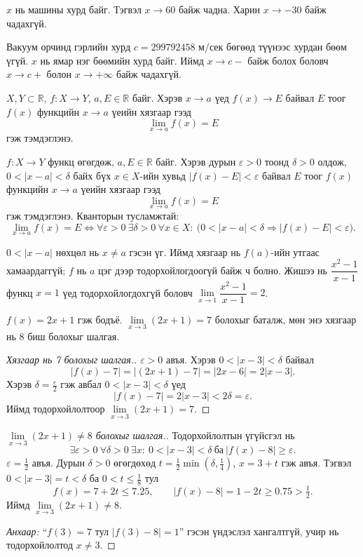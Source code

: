 \begin{example}
$x$ нь машины хурд байг. Тэгвэл $x \to 60$ байж чадна. Харин $x \to -30$ байж чадахгүй.

Вакуум орчинд гэрлийн хурд $c=299792458$ м/сек бөгөөд түүнээс хурдан бөөм үгүй. $x$ нь ямар нэг бөөмийн хурд байг.
Иймд $x \to c-$ байж болох боловч $x \to c+$ болон $x \to +\infty$ байж чадахгүй.
\end{example}
\begin{definition}
$X,Y \subset \mathbb{R}$, $f:X \to Y$, $a,E \in \mathbb{R}$ байг.
Хэрэв $x \to a$ үед $f(x) \to E$ байвал $E$ тоог $f(x)$ функцийн $x\to a$ үеийн хязгаар гээд
\[
\lim_{x \to a} f(x) = E
\]
гэж тэмдэглэнэ.
\end{definition}

\begin{definition}
$f:X \to Y$ функц өгөгдөж, $a,E \in \mathbb{R}$ байг.
Хэрэв дурын $\varepsilon>0$ тоонд $\delta>0$ олдож, $0<|x-a|<\delta$ байх бүх $x\in X$-ийн хувьд $|f(x)-E|<\varepsilon$ байвал $E$ тоог $f(x)$ функцийн $x\to a$ үеийн хязгаар гээд
\[
\lim_{x \to a} f(x) = E
\]
гэж тэмдэглэнэ. Кванторын тусламжтай:
\[
\lim_{x \to a} f(x) = E \iff \forall\varepsilon>0\ \exists\delta>0\ \forall x\in X:\ \bigl(0<|x-a|<\delta\Rightarrow|f(x)-E|<\varepsilon\bigr).
\]
\end{definition}

\begin{remark}
$0<|x-a|$ нөхцөл нь $x\neq a$ гэсэн үг. Иймд хязгаар нь $f(a)$-ийн утгаас хамаардаггүй;
$f$ нь $a$ цэг дээр тодорхойлогдоогүй байж ч болно. Жишээ нь $\dfrac{x^2-1}{x-1}$ функц $x=1$ үед
тодорхойлогдохгүй боловч $\lim\limits_{x\to1}\dfrac{x^2-1}{x-1}=2$.
\end{remark}

\begin{example}
$f(x)=2x+1$ гэж бодъё. $\lim\limits_{x\to 3}(2x+1)=7$ болохыг баталж, мөн энэ хязгаар нь 8 биш болохыг шалгая.

\begin{proof}[Хязгаар нь 7 болохыг шалгая.]
$\varepsilon>0$ авъя. Хэрэв $0<|x-3|<\delta$ байвал
\[
|f(x)-7| = |(2x+1)-7| = |2x-6| = 2|x-3|.
\]
Хэрэв $\delta=\tfrac{\varepsilon}{2}$ гэж авбал $0<|x-3|<\delta$ үед
\[
|f(x)-7| = 2|x-3| < 2\delta = \varepsilon.
\]
Иймд тодорхойлолтоор $\lim\limits_{x\to 3}(2x+1)=7$.
\end{proof}

\begin{proof}[$\lim\limits_{x\to 3}(2x+1)\neq 8$ болохыг шалгая.]
Тодорхойлолтын үгүйсгэл нь
\[
\exists\varepsilon>0\ \forall\delta>0\ \exists x:\ 0<|x-3|<\delta\ \text{ба}\ |f(x)-8|\ge\varepsilon.
\]
$\varepsilon=\tfrac12$ авъя. Дурын $\delta>0$ өгөгдөхөд $t=\tfrac12\min\left(\delta,\tfrac14\right)$,
$x=3+t$ гэж авъя. Тэгвэл $0<|x-3|=t<\delta$ ба $0<t\le\tfrac18$ тул
\[
f(x)=7+2t\le7.25,\qquad |f(x)-8|=1-2t\ge0.75>\tfrac12.
\]
Иймд $\lim\limits_{x\to 3}(2x+1)\neq 8$.

\textit{Анхаар:} ``$f(3)=7$ тул $|f(3)-8|=1$'' гэсэн үндэслэл хангалтгүй, учир нь тодорхойлолтод $x\ne3$.
\end{proof}
\end{example}

